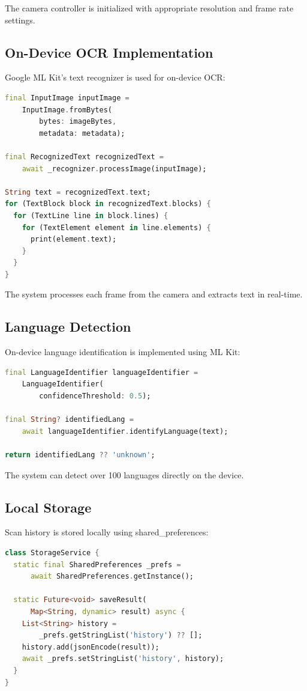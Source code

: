 \documentclass[12pt,a4paper]{report}
\begin{document}
The camera controller is initialized with appropriate resolution and frame rate settings.

\subsection{On-Device OCR Implementation}

Google ML Kit's text recognizer is used for on-device OCR:

\begin{lstlisting}[language=Dart]
final InputImage inputImage = 
    InputImage.fromBytes(
        bytes: imageBytes,
        metadata: metadata);

final RecognizedText recognizedText = 
    await _recognizer.processImage(inputImage);

String text = recognizedText.text;
for (TextBlock block in recognizedText.blocks) {
  for (TextLine line in block.lines) {
    for (TextElement element in line.elements) {
      print(element.text);
    }
  }
}
\end{lstlisting}

The system processes each frame from the camera and extracts text in real-time.

\subsection{Language Detection}

On-device language identification is implemented using ML Kit:

\begin{lstlisting}[language=Dart]
final LanguageIdentifier languageIdentifier = 
    LanguageIdentifier(
        confidenceThreshold: 0.5);

final String? identifiedLang = 
    await languageIdentifier.identifyLanguage(text);

return identifiedLang ?? 'unknown';
\end{lstlisting}

The system can detect over 100 languages directly on the device.

\subsection{Local Storage}

Scan history is stored locally using shared\_preferences:

\begin{lstlisting}[language=Dart]
class StorageService {
  static final SharedPreferences _prefs = 
      await SharedPreferences.getInstance();
  
  static Future<void> saveResult(
      Map<String, dynamic> result) async {
    List<String> history = 
        _prefs.getStringList('history') ?? [];
    history.add(jsonEncode(result));
    await _prefs.setStringList('history', history);
  }
}
\end{lstlisting}
\end{document}
